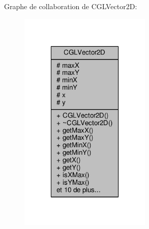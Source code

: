 Graphe de collaboration de C\-G\-L\-Vector2\-D\-:
\nopagebreak
\begin{figure}[H]
\begin{center}
\leavevmode
\includegraphics[width=178pt]{db/d79/class_c_g_l_vector2_d__coll__graph}
\end{center}
\end{figure}
